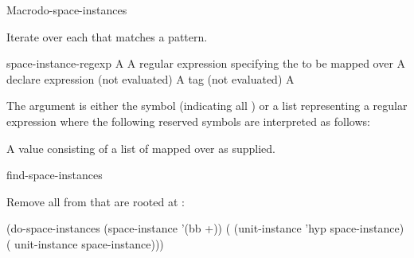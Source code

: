 \documentclass[10pt,twoside,english,pdftex]{article}
\begin{document}

\begin{functiondoc}{Macro}{do-space-instances}%
  {
    }

\fnsyntax

\fnpurpose Iterate over each  that matches a
 pattern.

\fnpackage {}

\fnmodule {}

\fnargs
\begin{args}{space-instance-regexp}
\arg[var] A 
 A  regular expression
specifying the  to be mapped over
\arg[declaration] A declare expression (not evaluated)
\arg[tag] A  tag (not evaluated)
\arg[form] A 
\end{args}

\fndescription 
The  argument is either the symbol
 (indicating all ) or a list
representing a regular expression where the following reserved symbols
are interpreted as follows:
\spaceinstanceregexp

A  value consisting of a list of
 mapped over as supplied.

\begin{alsos}{find-space-instances}
\end{alsos}

\fnexample 
{}%
%
Remove all   from
 that are rooted at :
%
\W\supp
\begin{example}
  (do-space-instances (space-instance '(bb +))
    ( (unit-instance 'hyp space-instance)
      ( unit-instance space-instance)))
\end{example}

\end{functiondoc}

\end{document}
